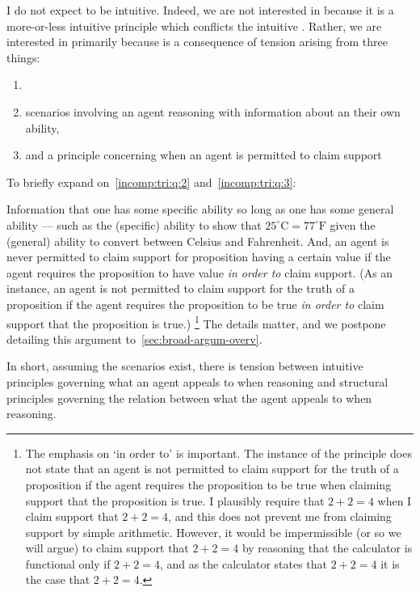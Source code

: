 \begin{note}
  \color{details}
  I do not expect \EAS{} to be intuitive.
  Indeed, we are not interested in \EAS{} because it is a more-or-less intuitive principle which conflicts the intuitive \ESU{}.
  Rather, we are interested in \EAS{} primarily because \EAS{} is a consequence of tension arising from three things:

  \begin{enumerate}
  \item\label{incomp:tri:q:1} \ESU{}
  \item\label{incomp:tri:q:2} scenarios involving an agent reasoning with information about an their own ability,
  \item\label{incomp:tri:q:3} and a principle concerning when an agent is permitted to claim support
  \end{enumerate}

  To briefly expand on~\ref{incomp:tri:q:2} and~\ref{incomp:tri:q:3}:

  Information that one has some specific ability so long as one has some general ability --- such as the (specific) ability to show that \(25^{\circ}\text{C} = 77^{\circ}\text{F}\) given the (general) ability to convert between Celsius and Fahrenheit.
  And, an agent is never permitted to claim support for proposition having a certain value if the agent requires the proposition to have value \emph{in order to} claim support.
  (As an instance, an agent is not permitted to claim support for the truth of a proposition if the agent requires the proposition to be true \emph{in order to} claim support that the proposition is true.)\nolinebreak
  \footnote{
    The emphasis on `in order to' is important.
    The instance of the principle does not state that an agent is not permitted to claim support for the truth of a proposition if the agent requires the proposition to be true when claiming support that the proposition is true.
    I plausibly require that \(2 + 2 = 4\) when I claim support that \(2 + 2 = 4\), and this does not prevent me from claiming support by simple arithmetic.
    However, it would be impermissible (or so we will argue) to claim support that \(2 + 2 = 4\) by reasoning that the calculator is functional only if \(2 + 2 = 4\), and as the calculator states that \(2 + 2 = 4\) it is the case that \(2 + 2 = 4\).
  }
  The details matter, and we postpone detailing this argument to~\autoref{sec:broad-argum-overv}.

  In short, assuming the scenarios exist, there is tension between intuitive principles governing what an agent appeals to when reasoning and structural principles governing the relation between what the agent appeals to when reasoning.
\end{note}

